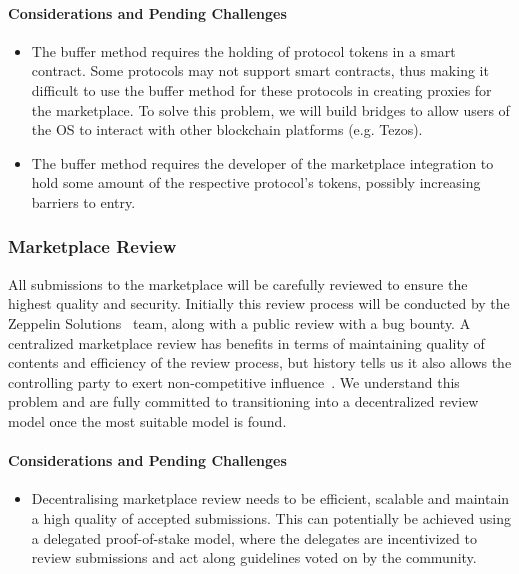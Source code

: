 \documentclass[]{article}
\makeatletter
\let\oldparagraph\paragraph
\renewcommand{\paragraph}[1]{\oldparagraph{#1}\mbox{}}
\DeclareRobustCommand{\_}{%
  \leavevmode\vbox{%
    \hrule\@width.5em
          \@height-.26ex
          \@depth\dimexpr.26ex+.28pt\relax}}
\makeatother
\begin{document}
\paragraph{Considerations and Pending Challenges}

\begin{itemize}

  \item
    The buffer method requires the holding of protocol tokens in a smart
    contract. Some protocols may not support smart contracts, thus making it
    difficult to use the buffer method for these protocols in creating proxies
    for the marketplace. To solve this problem, we will build bridges to allow
    users of the OS to interact with other blockchain platforms (e.g. Tezos).

  \item
    The buffer method requires the developer of the marketplace integration to
    hold some amount of the respective protocol's tokens, possibly increasing
    barriers to entry.

\end{itemize}

\subsubsection{Marketplace Review}

All submissions to the marketplace will be carefully reviewed to ensure
the highest quality and security. Initially this review process will be
conducted by the Zeppelin Solutions~\cite{zeppelinsols} team, along with a public
review with a bug bounty. A centralized marketplace review has
benefits in terms of maintaining quality of contents and efficiency of
the review process, but history tells us it also allows the controlling
party to exert non-competitive influence~\cite{apple}. We understand this
problem and are fully committed to transitioning into a decentralized
review model once the most suitable model is found.

\paragraph{Considerations and Pending Challenges}

\begin{itemize}

  \item
    Decentralising marketplace review needs to be efficient, scalable and
    maintain a high quality of accepted submissions. This can potentially
    be achieved using a delegated proof-of-stake model, where the
    delegates are incentivized to review submissions and act along
    guidelines voted on by the community.

\end{itemize}
\end{document}

